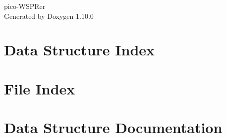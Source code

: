 \documentclass[twoside]{book}
\newcommand{\+}{\discretionary{\mbox{\scriptsize$\hookleftarrow$}}{}{}}
\newcommand{\clearemptydoublepage}{%
    \newpage{\pagestyle{empty}\cleardoublepage}%
  }
\begin{document}
  \raggedbottom
    \hypersetup{pageanchor=false,
                bookmarksnumbered=true,
                pdfencoding=unicode
               }
  \begin{titlepage}
  \vspace*{7cm}
  \begin{center}%
  {\Large pico-\/\+WSPRer}\\
  \vspace*{1cm}
  {\large Generated by Doxygen 1.10.0}\\
  \end{center}
  \end{titlepage}
  \clearemptydoublepage
  \tableofcontents
  \clearemptydoublepage
  \hypersetup{pageanchor=true}


\chapter{Data Structure Index}

\chapter{File Index}

\chapter{Data Structure Documentation}








\end{document}
